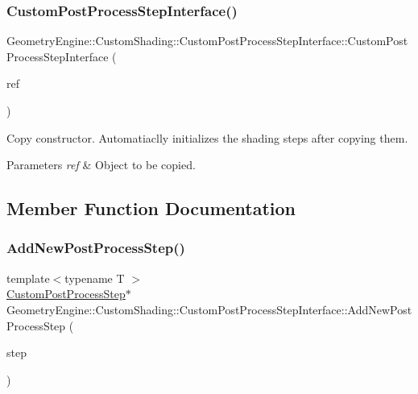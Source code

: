 \subsubsection{\texorpdfstring{CustomPostProcessStepInterface()}{CustomPostProcessStepInterface()}}
{\footnotesize\ttfamily Geometry\+Engine\+::\+Custom\+Shading\+::\+Custom\+Post\+Process\+Step\+Interface\+::\+Custom\+Post\+Process\+Step\+Interface (\begin{DoxyParamCaption}\item[{const \mbox{\hyperlink{class_geometry_engine_1_1_custom_shading_1_1_custom_post_process_step_interface}{Custom\+Post\+Process\+Step\+Interface}} \&}]{ref }\end{DoxyParamCaption})}

Copy constructor. Automatiaclly initializes the shading steps after copying them. 
\begin{DoxyParams}{Parameters}
{\em ref} & Object to be copied. \\
\hline
\end{DoxyParams}


\subsection{Member Function Documentation}
\mbox{\label{class_geometry_engine_1_1_custom_shading_1_1_custom_post_process_step_interface_a7bf73f58aebc554ad16a224d1a1afcf1}} 
\subsubsection{\texorpdfstring{AddNewPostProcessStep()}{AddNewPostProcessStep()}}
{\footnotesize\ttfamily template$<$typename T $>$ \\
\mbox{\hyperlink{class_geometry_engine_1_1_custom_shading_1_1_custom_post_process_step}{Custom\+Post\+Process\+Step}}$\ast$ Geometry\+Engine\+::\+Custom\+Shading\+::\+Custom\+Post\+Process\+Step\+Interface\+::\+Add\+New\+Post\+Process\+Step (\begin{DoxyParamCaption}\item[{const \mbox{\hyperlink{namespace_geometry_engine_1_1_custom_shading_a09e44ca81de5fe08c6d50271d680c4b1}{Custom\+Post\+Process\+Steps}} \&}]{step }\end{DoxyParamCaption})\hspace{0.3cm}{\ttfamily [inline]}}

